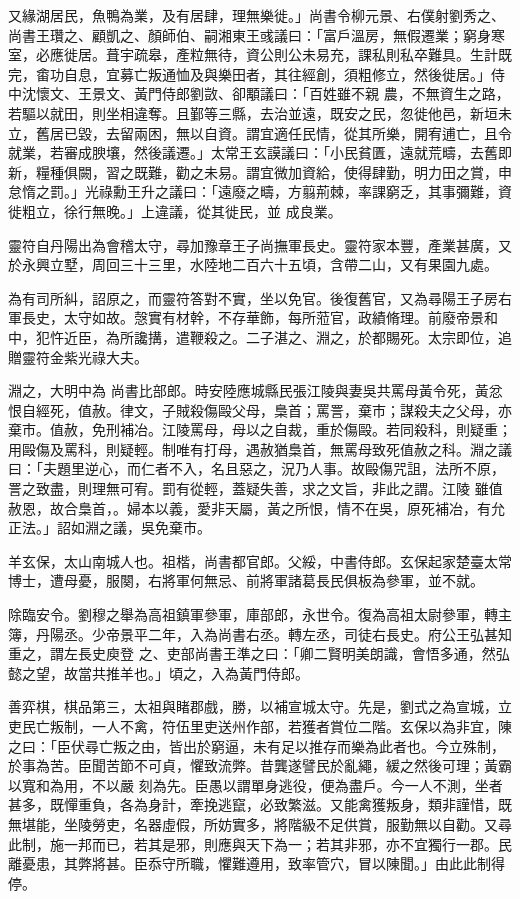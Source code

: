 \begin{pinyinscope}
 又緣湖居民，魚鴨為業，及有居肆，理無樂徙。」尚書令柳元景、右僕射劉秀之、尚書王瓚之、顧凱之、顏師伯、嗣湘東王彧議曰：「富戶溫房，無假遷業；窮身寒室，必應徙居。葺宇疏皋，產粒無待，資公則公未易充，課私則私卒難具。生計既完，畬功自息，宜募亡叛通恤及與樂田者，其往經創，須粗修立，然後徙居。」侍中沈懷文、王景文、黃門侍郎劉敳、卻顒議曰：「百姓雖不親
 農，不無資生之路，若驅以就田，則坐相違奪。且鄞等三縣，去治並遠，既安之民，忽徙他邑，新垣未立，舊居已毀，去留兩困，無以自資。謂宜適任民情，從其所樂，開宥逋亡，且令就業，若審成腴壤，然後議遷。」太常王玄謨議曰：「小民貧匱，遠就荒疇，去舊即新，糧種俱闕，習之既難，勸之未易。謂宜微加資給，使得肆勤，明力田之賞，申怠惰之罰。」光祿勳王升之議曰：「遠廢之疇，方翦荊棘，率課窮乏，其事彌難，資徙粗立，徐行無晚。」上違議，從其徙民，並
 成良業。



 靈符自丹陽出為會稽太守，尋加豫章王子尚撫軍長史。靈符家本豐，產業甚廣，又於永興立墅，周回三十三里，水陸地二百六十五頃，含帶二山，又有果園九處。



 為有司所糾，詔原之，而靈符答對不實，坐以免官。後復舊官，又為尋陽王子房右軍長史，太守如故。愨實有材幹，不存華飾，每所蒞官，政績脩理。前廢帝景和中，犯忤近臣，為所讒搆，遣鞭殺之。二子湛之、淵之，於都賜死。太宗即位，追贈靈符金紫光祿大夫。



 淵之，大明中為
 尚書比部郎。時安陸應城縣民張江陵與妻吳共罵母黃令死，黃忿恨自經死，值赦。律文，子賊殺傷毆父母，梟首；罵詈，棄市；謀殺夫之父母，亦棄市。值赦，免刑補冶。江陵罵母，母以之自裁，重於傷毆。若同殺科，則疑重；用毆傷及罵科，則疑輕。制唯有打母，遇赦猶梟首，無罵母致死值赦之科。淵之議曰：「夫題里逆心，而仁者不入，名且惡之，況乃人事。故毆傷咒詛，法所不原，詈之致盡，則理無可宥。罰有從輕，蓋疑失善，求之文旨，非此之謂。江陵
 雖值赦恩，故合梟首，。婦本以義，愛非天屬，黃之所恨，情不在吳，原死補冶，有允正法。」詔如淵之議，吳免棄市。



 羊玄保，太山南城人也。祖楷，尚書都官郎。父綏，中書侍郎。玄保起家楚臺太常博士，遭母憂，服闋，右將軍何無忌、前將軍諸葛長民俱板為參軍，並不就。



 除臨安令。劉穆之舉為高祖鎮軍參軍，庫部郎，永世令。復為高祖太尉參軍，轉主簿，丹陽丞。少帝景平二年，入為尚書右丞。轉左丞，司徒右長史。府公王弘甚知重之，謂左長史庾登
 之、吏部尚書王準之曰：「卿二賢明美朗識，會悟多通，然弘懿之望，故當共推羊也。」頃之，入為黃門侍郎。



 善弈棋，棋品第三，太祖與睹郡戲，勝，以補宣城太守。先是，劉式之為宣城，立吏民亡叛制，一人不禽，符伍里吏送州作部，若獲者賞位二階。玄保以為非宜，陳之曰：「臣伏尋亡叛之由，皆出於窮逼，未有足以推存而樂為此者也。今立殊制，於事為苦。臣聞苦節不可貞，懼致流弊。昔龔遂譬民於亂繩，緩之然後可理；黃霸以寬和為用，不以嚴
 刻為先。臣愚以謂單身逃役，便為盡戶。今一人不測，坐者甚多，既憚重負，各為身計，牽挽逃竄，必致繁滋。又能禽獲叛身，類非謹惜，既無堪能，坐陵勞吏，名器虛假，所妨實多，將階級不足供賞，服勤無以自勸。又尋此制，施一邦而已，若其是邪，則應與天下為一；若其非邪，亦不宜獨行一郡。民離憂患，其弊將甚。臣忝守所職，懼難遵用，致率管穴，冒以陳聞。」由此此制得停。




\end{pinyinscope}
